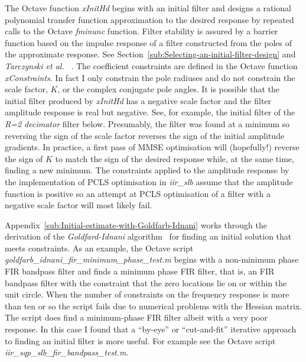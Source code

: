 \documentclass[a4paper,twoside,10pt,english]{report}
\begin{document}
The Octave function \emph{xInitHd}
begins with an initial filter and designs a rational polynomial transfer 
function approximation to the desired response by repeated calls to the Octave
\emph{fminunc} function. Filter stability is assured by a barrier function 
based on the impulse response of a filter constructed from the poles of the 
approximate response. See Section~\ref{sub:Selecting-an-initial-filter-design}
and \emph{Tarczynski et al.}
~\cite{TarczynskiCainHermanowiczRojewski_WISEMethodDesignIIRFilters}.
The coefficient constraints are defined in the Octave function 
\emph{xConstraints}. In fact I only constrain the pole radiuses and do not 
constrain the scale factor, $K$, or the complex conjugate pole angles.
It is possible that the initial filter produced by \emph{xInitHd} has a
negative scale factor and the filter amplitude response is real but negative.
See, for example, the initial filter of the \emph{R=2 decimator} filter below. 
Presumably, the filter was found at a minimum so reversing the sign of the
scale factor reverses the sign of the initial amplitude gradients. In 
practice, a first pass of MMSE optimisation will (hopefully!) reverse the
sign of $K$ to match the sign of the desired response while, at the same time,
finding a new minimum. The constraints applied to the amplitude response by 
the implementation of PCLS optimisation in \emph{iir\_slb} assume that the 
amplitude function is positive so an attempt at PCLS optimisation of a filter
with a negative scale factor will most likely fail.

Appendix~\ref{sub:Initial-estimate-with-Goldfarb-Idnani} works through the 
derivation of the \emph{Goldfard-Idnani} 
algorithm~\cite{GoldfarbIdnani_NumericallyStableDualQuadraticPrograms} for 
finding an initial solution that meets constraints. As an example, 
the Octave script \emph{goldfarb\_idnani\_fir\_minimum\_phase\_test.m}
begins with a 
non-minimum phase FIR bandpass filter and finds a minimum phase FIR filter, that
is, an FIR bandpass filter with the constraint that the zero locations lie on
or within the unit circle. When the number of constraints on the frequency 
response is more than ten or so the script fails due to numerical problems with
the Hessian matrix. The script does find a minimum-phase FIR filter albeit with a
very poor response. In this case I found that a ``by-eye'' or ``cut-and-fit''
iterative approach to finding an initial filter is more useful. For 
example see the Octave script \emph{iir\_sqp\_slb\_fir\_bandpass\_test.m}.
\end{document}
